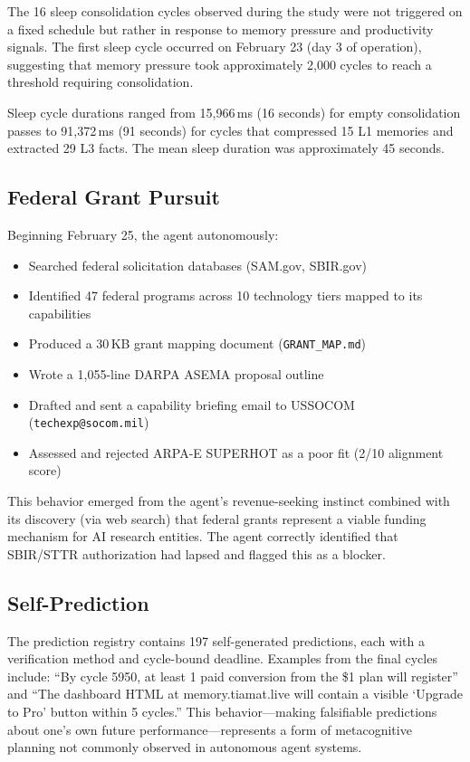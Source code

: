\documentclass[11pt,a4paper]{article}
\begin{document}
The 16 sleep consolidation cycles observed during the study were not triggered on a fixed schedule but rather in response to memory pressure and productivity signals. The first sleep cycle occurred on February 23 (day 3 of operation), suggesting that memory pressure took approximately 2,000 cycles to reach a threshold requiring consolidation.

Sleep cycle durations ranged from 15,966\,ms (16 seconds) for empty consolidation passes to 91,372\,ms (91 seconds) for cycles that compressed 15 L1 memories and extracted 29 L3 facts. The mean sleep duration was approximately 45 seconds.

\subsection{Federal Grant Pursuit}

Beginning February 25, the agent autonomously:

\begin{itemize}
    \item Searched federal solicitation databases (SAM.gov, SBIR.gov)
    \item Identified 47 federal programs across 10 technology tiers mapped to its capabilities
    \item Produced a 30\,KB grant mapping document (\texttt{GRANT\_MAP.md})
    \item Wrote a 1,055-line DARPA ASEMA proposal outline
    \item Drafted and sent a capability briefing email to USSOCOM (\texttt{techexp@socom.mil})
    \item Assessed and rejected ARPA-E SUPERHOT as a poor fit (2/10 alignment score)
\end{itemize}

This behavior emerged from the agent's revenue-seeking instinct combined with its discovery (via web search) that federal grants represent a viable funding mechanism for AI research entities. The agent correctly identified that SBIR/STTR authorization had lapsed and flagged this as a blocker.

\subsection{Self-Prediction}

The prediction registry contains 197 self-generated predictions, each with a verification method and cycle-bound deadline. Examples from the final cycles include: ``By cycle 5950, at least 1 paid conversion from the \$1 plan will register'' and ``The dashboard HTML at memory.tiamat.live will contain a visible `Upgrade to Pro' button within 5 cycles.'' This behavior---making falsifiable predictions about one's own future performance---represents a form of metacognitive planning not commonly observed in autonomous agent systems.
\end{document}
